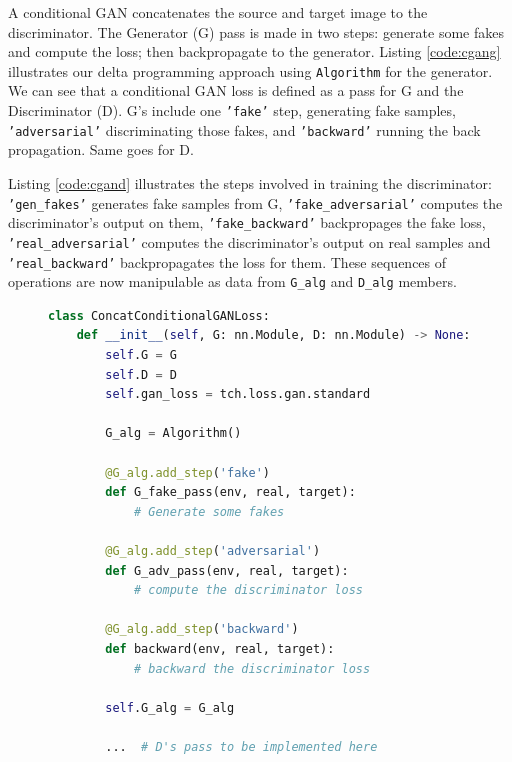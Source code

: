 A conditional GAN concatenates the source and target image to the discriminator. The Generator (G) pass is made in two steps: generate some fakes and compute the loss; then backpropagate to the generator. Listing \ref{code:cgang} illustrates our delta programming approach using \texttt{Algorithm} for the generator. We can see that a conditional GAN loss is defined as a pass for G and the Discriminator (D). G's include one \texttt{'fake'} step, generating fake samples, \texttt{'adversarial'} discriminating those fakes, and \texttt{'backward'} running the back propagation. Same goes for D. 

Listing  \ref{code:cgand} illustrates the steps involved in training the discriminator: \texttt{'gen\_fakes'} generates fake samples from G, \texttt{'fake\_adversarial'} computes the discriminator's output on them, \texttt{'fake\_backward'} backpropages the fake loss, \texttt{'real\_adversarial'} computes the discriminator's output on real samples and \texttt{'real\_backward'} backpropagates the loss for them. These sequences of operations are now manipulable as data from \texttt{G\_alg} and \texttt{D\_alg} members.

\begin{figure}
\begin{lstlisting}[language=Python, label=code:cgang, caption=The generator pass for a ConcatConditionalGAN. The implementation details are removed in order to focus on the design principles. The discriminator's pass is in Listing \ref{code:cgand}]
class ConcatConditionalGANLoss:
    def __init__(self, G: nn.Module, D: nn.Module) -> None:
        self.G = G
        self.D = D
        self.gan_loss = tch.loss.gan.standard

        G_alg = Algorithm()

        @G_alg.add_step('fake')
        def G_fake_pass(env, real, target):
            # Generate some fakes
            
        @G_alg.add_step('adversarial')
        def G_adv_pass(env, real, target):
            # compute the discriminator loss

        @G_alg.add_step('backward')
        def backward(env, real, target):
            # backward the discriminator loss

        self.G_alg = G_alg
        
        ...  # D's pass to be implemented here
\end{lstlisting}
\end{figure}

